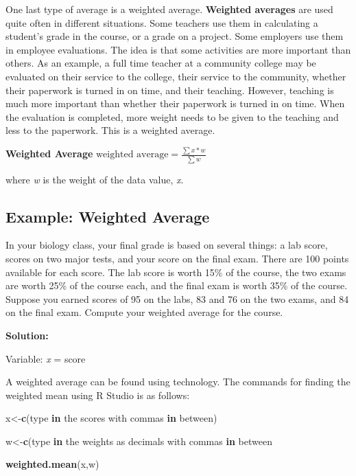 \documentclass[
]{book}
\newenvironment{Shaded}{\begin{snugshade}}{\end{snugshade}}
\newcommand{\ControlFlowTok}[1]{\textcolor[rgb]{0.13,0.29,0.53}{\textbf{#1}}}
\newcommand{\KeywordTok}[1]{\textcolor[rgb]{0.13,0.29,0.53}{\textbf{#1}}}
\newcommand{\NormalTok}[1]{#1}
\begin{document}
One last type of average is a weighted average. \textbf{Weighted averages} are used quite often in different situations. Some teachers use them in calculating a student's grade in the course, or a grade on a project. Some employers use them in employee evaluations. The idea is that some activities are more
important than others. As an example, a full time teacher at a community college may be evaluated on their service to the college, their service to the community, whether their paperwork is turned in on time, and their teaching. However, teaching is much more important than whether their paperwork is turned in on time. When the evaluation is completed, more weight needs to be given to the teaching and less to the paperwork. This is a weighted average.

\textbf{Weighted Average}
\(\text{weighted average}=\frac{\sum{x*w}}{\sum{w}}\)

where \emph{w} is the weight of the data value, \emph{x}.

\hypertarget{example-weighted-average}{%
\subsection{Example: Weighted Average}\label{example-weighted-average}}

In your biology class, your final grade is based on several things: a lab score, scores on two major tests, and your score on the final exam. There are 100 points available for each score. The lab score is worth 15\% of the course, the two exams are worth 25\% of the course each, and the final exam is worth 35\% of the course. Suppose you earned scores of 95 on the labs, 83 and 76 on the two exams, and 84 on the final exam. Compute your weighted average for the course.

\textbf{Solution:}

Variable: \emph{x} = score

A weighted average can be found using technology. The commands for finding the weighted mean using R Studio is as follows:

\begin{Shaded}
\begin{Highlighting}[]
\NormalTok{ x<-}\KeywordTok{c}\NormalTok{(type }\ControlFlowTok{in}\NormalTok{ the scores with commas }\ControlFlowTok{in}\NormalTok{ between)}

\NormalTok{ w<-}\KeywordTok{c}\NormalTok{(type }\ControlFlowTok{in}\NormalTok{ the weights as decimals with commas }\ControlFlowTok{in}\NormalTok{ between}

 \KeywordTok{weighted.mean}\NormalTok{(x,w)}
\end{Highlighting}
\end{Shaded}
\end{document}
